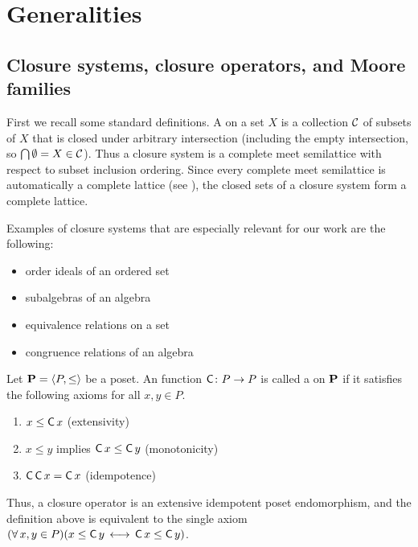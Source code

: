 \section{Generalities}
\label{sec:more-gener-appr}

\subsection{Closure systems, closure operators, and Moore families}
First we recall some standard definitions.
A  on a set $X$ is a collection $\mathcal{C}$
of subsets of $X$ that is closed under arbitrary intersection (including the empty 
intersection, so $\bigcap \emptyset = X \in \mathcal{C}$). 
Thus a closure system is a complete meet semilattice with respect to subset
inclusion ordering. 
Since every complete meet semilattice is automatically a complete lattice
(see \cite[Theorem 2.5]{Nation-notes}), 
the closed sets of a closure system form a complete lattice. 

Examples of closure systems that are especially relevant for our work are the following:
\begin{itemize}
\item order ideals of an ordered set
\item subalgebras of an algebra 
\item equivalence relations on a set
\item congruence relations of an algebra
\end{itemize}

\newcommand{\cl}{\ensuremath{\operatorname{\sansC}}}

Let $\mathbf{P} = \langle P, \leq \rangle$ be a poset.
An function $\cl \colon P \to P$ is called a  on $\mathbf{P}$
if it satisfies the following axioms for all $x, y\in P$.
\begin{enumerate}
\item $x \leq \cl x$ (extensivity) 
\item $x \leq y$ implies $\cl x \leq \cl y$ (monotonicity) 
\item $\cl \cl x = \cl x$ (idempotence) 
\end{enumerate}
Thus, a closure operator is an extensive idempotent poset endomorphism,
and the definition above is equivalent to the single axiom
$(\forall\, x, y \in P) (x \leq \cl y \, \longleftrightarrow  \, \cl x \leq  \cl y)$.

